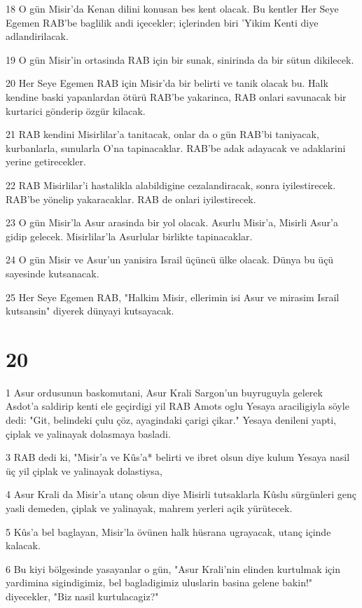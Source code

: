 \par 18 O gün Misir'da Kenan dilini konusan bes kent olacak. Bu kentler Her Seye Egemen RAB'be baglilik andi içecekler; içlerinden biri 'Yikim Kenti diye adlandirilacak.
\par 19 O gün Misir'in ortasinda RAB için bir sunak, sinirinda da bir sütun dikilecek.
\par 20 Her Seye Egemen RAB için Misir'da bir belirti ve tanik olacak bu. Halk kendine baski yapanlardan ötürü RAB'be yakarinca, RAB onlari savunacak bir kurtarici gönderip özgür kilacak.
\par 21 RAB kendini Misirlilar'a tanitacak, onlar da o gün RAB'bi taniyacak, kurbanlarla, sunularla O'na tapinacaklar. RAB'be adak adayacak ve adaklarini yerine getirecekler.
\par 22 RAB Misirlilar'i hastalikla alabildigine cezalandiracak, sonra iyilestirecek. RAB'be yönelip yakaracaklar. RAB de onlari iyilestirecek.
\par 23 O gün Misir'la Asur arasinda bir yol olacak. Asurlu Misir'a, Misirli Asur'a gidip gelecek. Misirlilar'la Asurlular birlikte tapinacaklar.
\par 24 O gün Misir ve Asur'un yanisira Israil üçüncü ülke olacak. Dünya bu üçü sayesinde kutsanacak.
\par 25 Her Seye Egemen RAB, "Halkim Misir, ellerimin isi Asur ve mirasim Israil kutsansin" diyerek dünyayi kutsayacak.

\chapter{20}

\par 1 Asur ordusunun baskomutani, Asur Krali Sargon'un buyruguyla gelerek Asdot'a saldirip kenti ele geçirdigi yil RAB Amots oglu Yesaya araciligiyla söyle dedi: "Git, belindeki çulu çöz, ayagindaki çarigi çikar." Yesaya denileni yapti, çiplak ve yalinayak dolasmaya basladi.
\par 3 RAB dedi ki, "Misir'a ve Kûs'a* belirti ve ibret olsun diye kulum Yesaya nasil üç yil çiplak ve yalinayak dolastiysa,
\par 4 Asur Krali da Misir'a utanç olsun diye Misirli tutsaklarla Kûslu sürgünleri genç yasli demeden, çiplak ve yalinayak, mahrem yerleri açik yürütecek.
\par 5 Kûs'a bel baglayan, Misir'la övünen halk hüsrana ugrayacak, utanç içinde kalacak.
\par 6 Bu kiyi bölgesinde yasayanlar o gün, "Asur Krali'nin elinden kurtulmak için yardimina sigindigimiz, bel bagladigimiz uluslarin basina gelene bakin!" diyecekler, "Biz nasil kurtulacagiz?"

